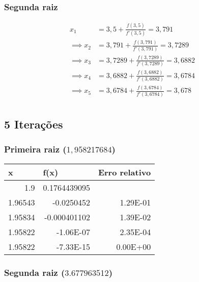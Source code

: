 \documentclass[12pt]{article}
\begin{document}
\subsubsection{Segunda raiz}
\begin{align*}
    x_1 &= 3,5 + \frac{f(3,5)}{f'(3,5)} = 3,791 \\
    \implies x_2 &= 3,791 + \frac{f(3,791)}{f'(3,791)} = 3,7289 \\
    \implies x_3 &= 3,7289 + \frac{f(3,7289)}{f'(3,7289)} = 3,6882 \\
    \implies x_4 &= 3,6882 + \frac{f(3,6882)}{f'(3,6882)} = 3,6784 \\
    \implies x_5 &= 3,6784 + \frac{f(3,6784)}{f'(3,6784)} = 3,678 \\
\end{align*}

\subsection{5 Iterações}
\subsubsection{Primeira raiz (\(1,958217684\))}

\begin{table}[H]
\centering
\begin{tabular}{@{}rrr@{}}
\toprule
\multicolumn{1}{l}{x} & \multicolumn{1}{l}{f(x)} & \multicolumn{1}{l}{Erro relativo} \\ \midrule
1.9                   & 0.1764439095             & \multicolumn{1}{l}{}              \\
1.96543               & -0.0250452               & 1.29E-01                          \\
1.95834               & -0.000401102             & 1.39E-02                          \\
1.95822               & -1.06E-07                & 2.35E-04                          \\
1.95822               & -7.33E-15                & 0.00E+00                          \\ \bottomrule
\end{tabular}
\end{table}

\subsubsection{Segunda raiz (\(3.677963512\))}
\end{document}
